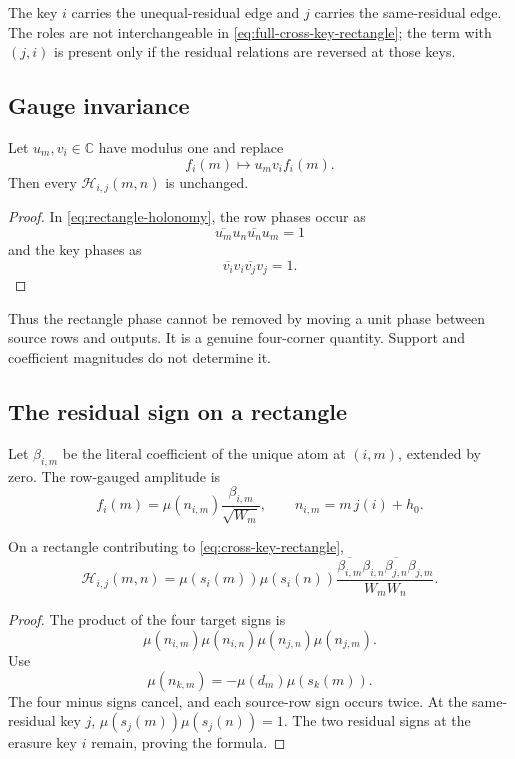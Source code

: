 The key \(i\) carries the unequal-residual edge and \(j\) carries the
same-residual edge.  The roles are not interchangeable in
\eqref{eq:full-cross-key-rectangle}; the term with \((j,i)\) is present
only if the residual relations are reversed at those keys.

\subsection{Gauge invariance}

\begin{proposition}
\label{prop:holonomy-gauge-invariant}
Let \(u_m,v_i\in\mathbb C\) have modulus one and replace
\[
 f_i(m)\longmapsto u_mv_if_i(m).
\]
Then every \(\mathcal H_{i,j}(m,n)\) is unchanged.
\end{proposition}

\begin{proof}
In \eqref{eq:rectangle-holonomy}, the row phases occur as
\[
 \overline{u_m}u_n\overline{u_n}u_m=1
\]
and the key phases as
\[
 \overline{v_i}v_i\overline{v_j}v_j=1.
\]
\end{proof}

Thus the rectangle phase cannot be removed by moving a unit phase between
source rows and outputs.  It is a genuine four-corner quantity.  Support
and coefficient magnitudes do not determine it.

\subsection{The residual sign on a rectangle}

Let \(\beta_{i,m}\) be the literal coefficient of the unique atom at
\((i,m)\), extended by zero.  The row-gauged amplitude is
\[
 f_i(m)
 =
 \mu(n_{i,m})\frac{\beta_{i,m}}{\sqrt{W_m}},
\qquad
 n_{i,m}=m\,j(i)+h_0.
\]

\begin{proposition}
\label{prop:rectangle-sign-reduction}
On a rectangle contributing to
\eqref{eq:cross-key-rectangle},
\begin{equation}
\boxed{
\mathcal H_{i,j}(m,n)
=
\mu(s_i(m))\mu(s_i(n))
\frac{
\overline{\beta_{i,m}}\beta_{i,n}
\overline{\beta_{j,n}}\beta_{j,m}
}{W_mW_n}.}
\label{eq:rectangle-sign-reduction}
\end{equation}
\end{proposition}

\begin{proof}
The product of the four target signs is
\[
 \mu(n_{i,m})\mu(n_{i,n})
 \mu(n_{j,n})\mu(n_{j,m}).
\]
Use
\[
 \mu(n_{k,m})=-\mu(d_m)\mu(s_k(m)).
\]
The four minus signs cancel, and each source-row sign occurs twice.  At the
same-residual key \(j\),
\(\mu(s_j(m))\mu(s_j(n))=1\).  The two residual signs at the erasure key
\(i\) remain, proving the formula.
\end{proof}

